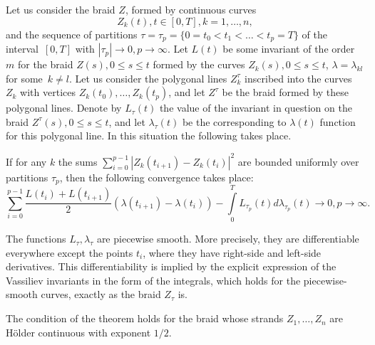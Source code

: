 \documentclass[12pt, a4paper, titlepage]{article}
\begin{document}
Let us consider the braid $Z$, formed by continuous curves
$$Z_k(t), t\in [0,T], k = 1,\ldots, n,$$ 
and the sequence of partitions
$\tau=\tau_p = \{0=t_0<t_1<\dots<t_p=T\}$ of the interval~$[0,T]$ with $|\tau_p|\to 0, p \to \infty$. 
Let $L(t)$ be some invariant of the order~$m$ for the braid $Z(s), 0\le s\le t$
formed by the curves $Z_k(s), 0\le s\le t$, $\lambda=\lambda_{kl}$ for some~$k\ne l$.
Let us consider the polygonal lines $Z_k^{\tau}$ inscribed into the curves $Z_k$ 
with vertices $Z_k(t_0), \ldots, Z_k(t_p)$, and let $Z^{\tau}$ be the braid
formed by these polygonal lines. Denote by $L_{\tau}(t)$ the value of the invariant in question
on the braid 
$Z^{\tau}(s), 0\le s\le t$, and let $\lambda_{\tau}(t)$ be the corresponding to $\lambda(t)$ 
function for this polygonal line.
In this situation the following takes place.
\begin{theorem}\label{PathwiseTheorem} If for any $k$
the sums $\sum\limits_{i=0}^{p-1}|Z_k(t_{i+1})-Z_k(t_i)|^2$ are bounded
uniformly over partitions $\tau_p$, then the following convergence takes place: 
\begin{equation}
 \sum_{i=0}^{p-1}
 \frac{L(t_i)+L(t_{i+1})}{2}(\lambda(t_{i+1})-\lambda(t_i))- 
 \int\limits_0^T L_{\tau_p}(t)d\lambda_{\tau_p}(t) \to 0, p \to \infty.
\end{equation}
\end{theorem}

\begin{remark}\label{differentiabilityRemark}
 The functions $L_{\tau}, \lambda_{\tau}$ are piecewise smooth. 
More precisely, they are differentiable everywhere except the points $t_i$, 
where they have right-side and left-side derivatives. 
This differentiability is implied by the explicit expression of the Vassiliev invariants
in the form of the integrals, which holds for the piecewise-smooth curves,
exactly as the braid  $Z_{\tau}$ is.
\end{remark}

\begin{remark}
 The condition of the theorem holds for the braid whose strands
 $Z_1, \ldots, Z_n$ are H{\"o}lder continuous with exponent $1/2$.
\end{remark}
\end{document}
